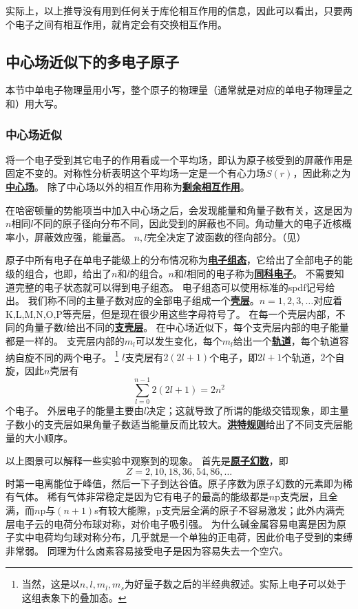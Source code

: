 \documentclass[UTF8, a4paper]{ctexart}
\renewcommand{\autoref}{\prettyref}
\newcommand*{\concept}[1]{\underline{\textbf{#1}}}
\begin{document}
实际上，以上推导没有用到任何关于库伦相互作用的信息，因此可以看出，只要两个电子之间有相互作用，就肯定会有交换相互作用。

\subsection{中心场近似下的多电子原子}

本节中单电子物理量用小写，整个原子的物理量（通常就是对应的单电子物理量之和）用大写。

\subsubsection{中心场近似}\label{sec:centric-field}

将一个电子受到其它电子的作用看成一个平均场，即认为原子核受到的屏蔽作用是固定不变的。对称性分析表明这个平均场一定是一个有心力场$S(r)$，因此称之为\concept{中心场}。
除了中心场以外的相互作用称为\concept{剩余相互作用}。

在哈密顿量的势能项当中加入中心场之后，会发现能量和角量子数有关，这是因为$n$相同$l$不同的原子径向分布不同，因此受到的屏蔽也不同。角动量大的电子近核概率小，屏蔽效应强，能量高。
$n, l$完全决定了波函数的径向部分。（见\autoref{sec:quantum-number}）

原子中所有电子在单电子能级上的分布情况称为\concept{电子组态}，它给出了全部电子的能级的组合，也即，给出了$n$和$l$的组合。$n$和$l$相同的电子称为\concept{同科电子}。
不需要知道完整的电子状态就可以得到电子组态。
电子组态可以使用标准的spdf记号给出。
我们称不同的主量子数对应的全部电子组成一个\concept{壳层}。$n=1, 2, 3, \ldots$对应着K,L,M,N,O,P等壳层，但是现在很少用这些字母符号了。
在每一个壳层内部，不同的角量子数$l$给出不同的\concept{支壳层}。
在中心场近似下，每个支壳层内部的电子能量都是一样的。
支壳层内部的$m_l$可以发生变化，每个$m_l$给出一个\concept{轨道}，每个轨道容纳自旋不同的两个电子。%
\footnote{当然，这是以$n,l,m_l,m_s$为好量子数之后的半经典叙述。实际上电子可以处于这组表象下的叠加态。}%
$l$支壳层有$2(2l+1)$个电子，即$2l+1$个轨道，$2$个自旋，因此$n$壳层有
\[
    \sum_{l=0}^{n-1} 2(2l+1) = 2n^2
\]
个电子。
外层电子的能量主要由$l$决定；这就导致了所谓的能级交错现象，即主量子数小的支壳层如果角量子数适当能量反而比较大。\concept{洪特规则}给出了不同支壳层能量的大小顺序。

以上图景可以解释一些实验中观察到的现象。
首先是\concept{原子幻数}，即
\[
    Z=2, 10, 18, 36, 54, 86, \ldots
\]
时第一电离能位于峰值，然后一下子到达谷值。原子序数为原子幻数的元素即为稀有气体。
稀有气体非常稳定是因为它有电子的最高的能级都是$n$p支壳层，且全满，而$n$p与$(n+1)$s有较大能隙，p支壳层全满的原子不容易激发；此外内满壳层电子云的电荷分布球对称，对价电子吸引强。
为什么碱金属容易电离是因为原子实中电荷均匀球对称分布，几乎就是一个单独的正电荷，因此价电子受到的束缚非常弱。
同理为什么卤素容易接受电子是因为容易失去一个空穴。
\end{document}
